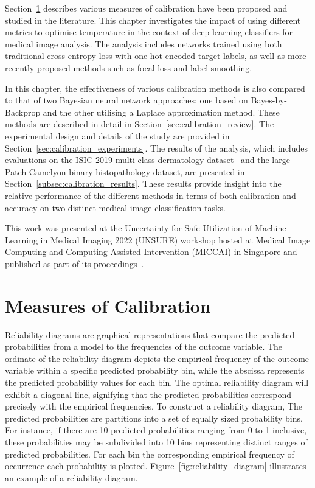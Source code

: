 Section~\ref{sec:calibration_measures} describes various measures of calibration have been proposed and studied in the literature. This chapter investigates the impact of using different metrics to optimise temperature in the context of deep learning classifiers for medical image analysis. The analysis includes networks trained using both traditional cross-entropy loss with one-hot encoded target labels, as well as more recently proposed methods such as focal loss and label smoothing.

In this chapter, the effectiveness of various calibration methods is also compared to that of two Bayesian neural network approaches: one based on Bayes-by-Backprop and the other utilising a Laplace approximation method. These methods are described in detail in Section~\ref{sec:calibration_review}. The experimental design and details of the study are provided in Section~\ref{sec:calibration_experiments}. The results of the analysis, which includes evaluations on the ISIC 2019 multi-class dermatology dataset~\citep{codella2018skin,combalia2019bcn20000,tschandl2018ham10000} and the large Patch-Camelyon binary histopathology dataset, are presented in Section~\ref{subsec:calibration_results}. These results provide insight into the relative performance of the different methods in terms of both calibration and accuracy on two distinct medical image classification tasks.

This work was presented at the Uncertainty for Safe Utilization of Machine Learning in Medical Imaging 2022 (UNSURE) workshop hosted at Medical Image Computing and Computing Assisted Intervention (MICCAI) in Singapore and published as part of its proceedings~\citep{carse2022calibration}.



\section{Measures of Calibration}
\label{sec:calibration_measures}
Reliability diagrams are graphical representations that compare the predicted probabilities from a model to the frequencies of the outcome variable. The ordinate of the reliability diagram depicts the empirical frequency of the outcome variable within a specific predicted probability bin, while the abscissa represents the predicted probability values for each bin. The optimal reliability diagram will exhibit a diagonal line, signifying that the predicted probabilities correspond precisely with the empirical frequencies. To construct a reliability diagram, The predicted probabilities are partitions into a set of equally sized probability bins. For instance, if there are 10 predicted probabilities ranging from 0 to 1 inclusive, these probabilities may be subdivided into 10 bins representing distinct ranges of predicted probabilities. For each bin the corresponding empirical frequency of occurrence each probability is plotted. Figure~\ref{fig:reliability_diagram} illustrates an example of a reliability diagram.

